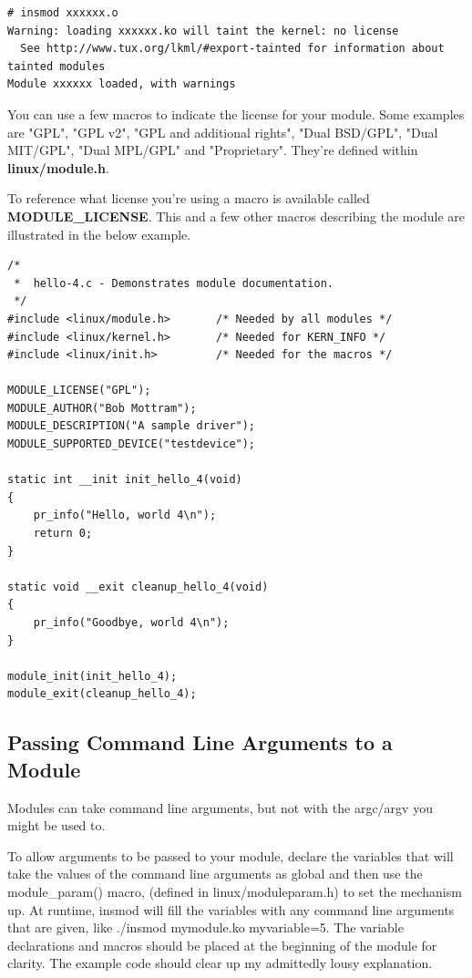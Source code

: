 \documentclass[11pt]{article}
\begin{document}
\begin{verbatim}
# insmod xxxxxx.o
Warning: loading xxxxxx.ko will taint the kernel: no license
  See http://www.tux.org/lkml/#export-tainted for information about tainted modules
Module xxxxxx loaded, with warnings
\end{verbatim}

You can use a few macros to indicate the license for your module. Some examples are "GPL", "GPL v2", "GPL and additional rights", "Dual BSD/GPL", "Dual MIT/GPL", "Dual MPL/GPL" and "Proprietary". They're defined within \textbf{linux/module.h}.

To reference what license you're using a macro is available called \textbf{MODULE\_LICENSE}. This and a few other macros describing the module are illustrated in the below example.

\begin{verbatim}
/*
 *  hello-4.c - Demonstrates module documentation.
 */
#include <linux/module.h>       /* Needed by all modules */
#include <linux/kernel.h>       /* Needed for KERN_INFO */
#include <linux/init.h>         /* Needed for the macros */

MODULE_LICENSE("GPL");
MODULE_AUTHOR("Bob Mottram");
MODULE_DESCRIPTION("A sample driver");
MODULE_SUPPORTED_DEVICE("testdevice");

static int __init init_hello_4(void)
{
    pr_info("Hello, world 4\n");
    return 0;
}

static void __exit cleanup_hello_4(void)
{
    pr_info("Goodbye, world 4\n");
}

module_init(init_hello_4);
module_exit(cleanup_hello_4);
\end{verbatim}

\subsection{Passing Command Line Arguments to a Module}
\label{sec:org76db4be}
Modules can take command line arguments, but not with the argc/argv you might be used to.

To allow arguments to be passed to your module, declare the variables that will take the values of the command line arguments as global and then use the module\_param() macro, (defined in linux/moduleparam.h) to set the mechanism up. At runtime, insmod will fill the variables with any command line arguments that are given, like ./insmod mymodule.ko myvariable=5. The variable declarations and macros should be placed at the beginning of the module for clarity. The example code should clear up my admittedly lousy explanation.
\end{document}
